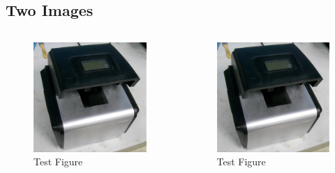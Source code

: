 \documentclass[
        handout,
        ]{beamer}
\begin{document}
\subsection{Two Images}
\begin{frame}[t]{\subsecname} %
    \begin{columns}
        \begin{figure}
        \centering
        \includegraphics[width=\textwidth]{im/testim}
        \caption{Test Figure}
        \end{figure}
        \begin{figure}
        \centering
        \includegraphics[width=\textwidth]{im/testim}
        \caption{Test Figure}
        \end{figure}
    \end{columns}
\end{frame}
\end{document}
